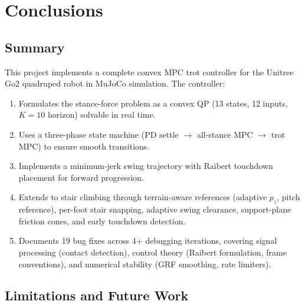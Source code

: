 \documentclass[12pt,a4paper]{report}
\begin{document}
\chapter{Conclusions}

\section{Summary}

This project implements a complete convex MPC trot controller for the Unitree
Go2 quadruped robot in MuJoCo simulation.  The controller:

\begin{enumerate}
    \item Formulates the stance-force problem as a convex QP (13 states,
          12 inputs, $K=10$ horizon) solvable in real time.
    \item Uses a three-phase state machine (PD settle $\to$ all-stance MPC
          $\to$ trot MPC) to ensure smooth transitions.
    \item Implements a minimum-jerk swing trajectory with Raibert touchdown
          placement for forward progression.
    \item Extends to stair climbing through terrain-aware references
          (adaptive $p_z$, pitch reference), per-foot stair snapping,
          adaptive swing clearance, support-plane friction cones, and
          early touchdown detection.
    \item Documents 19 bug fixes across 4+ debugging iterations, covering
          signal processing (contact detection), control theory (Raibert
          formulation, frame conventions), and numerical stability (GRF
          smoothing, rate limiters).
\end{enumerate}

\section{Limitations and Future Work}
\end{document}
